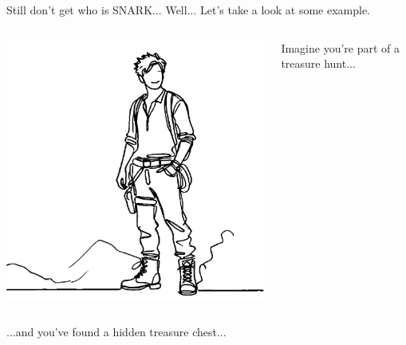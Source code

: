 \documentclass{zkdl-presentation-template}
\begin{document}
    \begin{frame}{Still don't get who is SNARK...}
        Well... Let's take a look at some example. \pause

        \begin{columns}
            \begin{column}{0.2\textwidth}
                \includegraphics[width=\linewidth]{../presentations/images/lecture_8/urtreasurehunter.png}
            \end{column}
    
            \begin{column}{0.7\textwidth}
                Imagine you're part of a treasure hunt...
            \end{column}
        \end{columns}

        \pause

        \begin{columns}
            \begin{column}{0.7\textwidth}
                ...and you've found a hidden treasure chest...
            \end{column}


\end{columns}
\end{frame}
\end{document}
